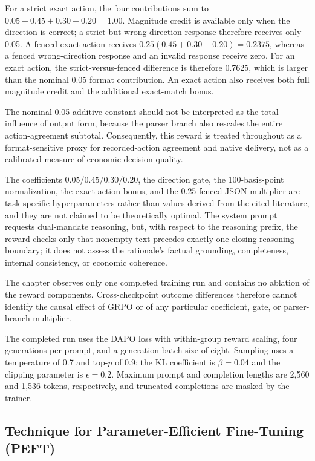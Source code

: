 For a strict exact action, the four contributions sum to
$0.05+0.45+0.30+0.20=1.00$. Magnitude credit is available only when the
direction is correct; a strict but wrong-direction response therefore receives
only 0.05. A fenced exact action receives
$0.25(0.45+0.30+0.20)=0.2375$, whereas a fenced wrong-direction response and an
invalid response receive zero. For an exact action, the strict-versus-fenced
difference is therefore 0.7625, which is larger than the nominal 0.05 format
contribution. An exact action also receives both full magnitude credit and the
additional exact-match bonus.

The nominal 0.05 additive constant should not be interpreted as the total
influence of output form, because the parser branch also rescales the entire
action-agreement subtotal. Consequently, this reward is treated throughout as
a format-sensitive proxy for recorded-action agreement and native delivery,
not as a calibrated measure of economic decision quality.

The coefficients $0.05/0.45/0.30/0.20$, the direction gate, the 100-basis-point
normalization, the exact-action bonus, and the 0.25 fenced-JSON multiplier are
task-specific hyperparameters rather than values derived from the cited
literature, and they are not claimed to be theoretically optimal. The system
prompt requests dual-mandate reasoning, but, with respect to the reasoning
prefix, the reward checks only that nonempty text precedes exactly one closing
reasoning boundary; it does not assess the rationale's factual grounding,
completeness, internal consistency, or economic coherence.

The chapter observes only one completed training run and contains no ablation
of the reward components. Cross-checkpoint outcome differences therefore
cannot identify the causal effect of GRPO or of any particular coefficient,
gate, or parser-branch multiplier.

The completed run uses the DAPO loss with within-group reward scaling, four
generations per prompt, and a generation batch size of eight. Sampling uses a
temperature of 0.7 and top-$p$ of 0.9; the KL coefficient is $\beta=0.04$ and
the clipping parameter is $\epsilon=0.2$. Maximum prompt and completion lengths
are 2,560 and 1,536 tokens, respectively, and truncated completions are masked
by the trainer.




\subsection*{Technique for Parameter-Efficient Fine-Tuning (PEFT)}

